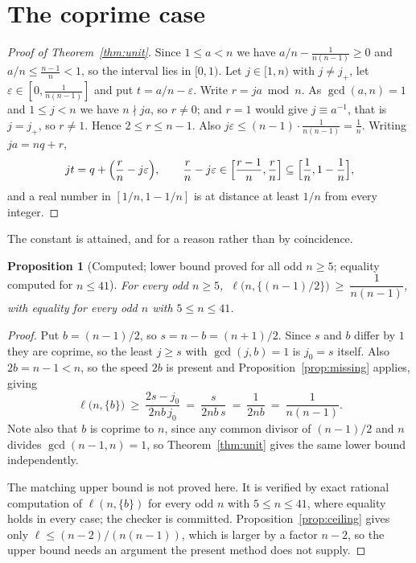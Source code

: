 \documentclass[11pt]{amsart}
\theoremstyle{plain}
\newtheorem{proposition}[theorem]{Proposition}
\theoremstyle{definition}
\begin{document}
\section{The coprime case}

\begin{proof}[Proof of Theorem~\ref{thm:unit}]
Since $1\le a<n$ we have $a/n-\frac1{n(n-1)}\ge0$ and $a/n\le\frac{n-1}{n}<1$, so the interval lies
in $[0,1)$. Let $j\in[1,n)$ with $j\ne j_+$, let $\varepsilon\in[0,\frac{1}{n(n-1)}]$ and put
$t=a/n-\varepsilon$. Write $r=ja\bmod n$. As $\gcd(a,n)=1$ and $1\le j<n$ we have $n\nmid ja$, so
$r\ne0$; and $r=1$ would give $j\equiv a^{-1}$, that is $j=j_+$, so $r\ne1$. Hence $2\le r\le n-1$.
Also $j\varepsilon\le(n-1)\cdot\frac1{n(n-1)}=\frac1n$. Writing $ja=nq+r$,
\[
  jt=q+\Bigl(\frac rn-j\varepsilon\Bigr),\qquad
  \frac rn-j\varepsilon\in\Bigl[\frac{r-1}{n},\frac rn\Bigr]\subseteq\Bigl[\frac1n,1-\frac1n\Bigr],
\]
and a real number in $[1/n,1-1/n]$ is at distance at least $1/n$ from every integer.
\end{proof}

The constant is attained, and for a reason rather than by coincidence.

\begin{proposition}[Computed; lower bound proved for all odd $n\ge5$; equality computed for $n\le41$]\label{prop:attained}
For every odd $n\ge5$, $\ \ell\bigl(n,\{(n-1)/2\}\bigr)\ \ge\ \dfrac{1}{n(n-1)}$, with equality for
every odd $n$ with $5\le n\le41$.
\end{proposition}

\begin{proof}
Put $b=(n-1)/2$, so $s=n-b=(n+1)/2$. Since $s$ and $b$ differ by $1$ they are coprime, so the least
$j\ge s$ with $\gcd(j,b)=1$ is $j_0=s$ itself. Also $2b=n-1<n$, so the speed $2b$ is present and
Proposition~\ref{prop:missing} applies, giving
\[
  \ell\bigl(n,\{b\}\bigr)\ \ge\ \frac{2s-j_0}{2nb\,j_0}\ =\ \frac{s}{2nb\,s}\ =\ \frac{1}{2nb}
  \ =\ \frac{1}{n(n-1)} .
\]
Note also that $b$ is coprime to $n$, since any common divisor of $(n-1)/2$ and $n$ divides
$\gcd(n-1,n)=1$, so Theorem~\ref{thm:unit} gives the same lower bound independently.

The matching upper bound is not proved here. It is verified by exact rational computation of
$\ell(n,\{b\})$ for every odd $n$ with $5\le n\le41$, where equality holds in every case; the
checker is committed. Proposition~\ref{prop:ceiling} gives only $\ell\le(n-2)/(n(n-1))$, which is
larger by a factor $n-2$, so the upper bound needs an argument the present method does not
supply.
\end{proof}
\end{document}
